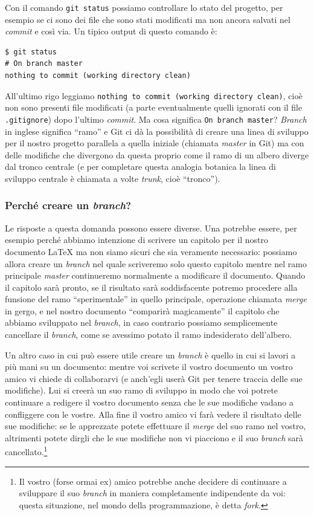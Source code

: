 \documentclass[a4paper,12pt,oneside]{article}
\begin{document}
Con il comando \lstinline|git status| possiamo controllare lo stato del progetto,
per esempio se ci sono dei file che sono stati modificati ma non ancora salvati
nel \emph{commit} e così via. Un tipico output di questo comando è:
\begin{lstlisting}
$ git status
# On branch master
nothing to commit (working directory clean)
\end{lstlisting}
All'ultimo rigo leggiamo \lstinline|nothing to commit (working directory clean)|,
cioè non sono presenti file modificati (a parte eventualmente quelli ignorati con
il file \lstinline|.gitignore|) dopo l'ultimo \emph{commit}. Ma cosa significa
\lstinline|On branch master|? \emph{Branch} in inglese significa ``ramo'' e
Git ci dà la possibilità di creare una linea di sviluppo per il nostro progetto
parallela a quella iniziale (chiamata \emph{master} in Git) ma con delle
modifiche che divergono da questa proprio come il ramo di un albero diverge dal
tronco centrale (e per completare questa analogia botanica la linea di sviluppo
centrale è chiamata a volte \emph{trunk}, cioè ``tronco'').

\subsubsection{Perché creare un \emph{branch}?}
Le risposte a questa domanda possono essere diverse. Una potrebbe essere, per
esempio perché abbiamo intenzione di scrivere un capitolo per il nostro documento
\LaTeX{} ma non siamo sicuri che sia veramente necessario: possiamo allora creare
un \emph{branch} nel quale scriveremo solo questo capitolo mentre nel ramo
principale \emph{master} continueremo normalmente a modificare il documento.
Quando il capitolo sarà pronto, se il risultato sarà soddisfacente potremo
procedere alla funsione del ramo ``sperimentale'' in quello principale, operazione
chiamata \emph{merge} in gergo, e nel nostro documento ``comparirà magicamente''
il capitolo che abbiamo sviluppato nel \emph{branch}, in caso contrario possiamo
semplicemente cancellare il \emph{branch}, come se avessimo potato il ramo
indesiderato dell'albero.

Un altro caso in cui può essere utile creare un \emph{branch} è quello in cui si
lavori a più mani su un documento: mentre voi scrivete il vostro documento un
vostro amico vi chiede di collaborarvi (e anch'egli userà Git per tenere traccia
delle sue modifiche). Lui si creerà un suo ramo di sviluppo in modo che voi
potrete continuare a redigere il vostro documento senza che le sue modifiche
vadano a confliggere con le vostre. Alla fine il vostro amico vi farà vedere il
risultato delle sue modifiche: se le apprezzate potete effettuare il \emph{merge}
del suo ramo nel vostro, altrimenti potete dirgli che le sue modifiche non vi
piacciono e il suo \emph{branch} sarà cancellato.\footnote{Il vostro (forse ormai
  ex) amico potrebbe anche decidere di continuare a sviluppare il suo
  \emph{branch} in maniera completamente indipendente da voi: questa situazione,
  nel mondo della programmazione, è detta \emph{fork}.}
\end{document}

